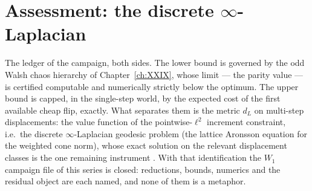 \section{Assessment: the discrete \texorpdfstring{$\infty$}{infinity}-Laplacian}\label{XXXVII:sec:assessment}

The ledger of the campaign, both sides. The lower bound is governed by the odd Walsh
chaos hierarchy of Chapter~\ref{ch:XXIX}, whose limit --- the parity value --- is certified
computable and numerically strictly below the optimum. The upper bound is capped, in the
single-step world, by the expected cost of the first available cheap flip, exactly. What
separates them is the metric $d_L$ on multi-step displacements: the value function of
the pointwise-$\ell^2$ increment constraint, i.e.\ the discrete $\infty$-Laplacian
geodesic problem (the lattice Aronsson equation for the weighted cone norm), whose exact
solution on the relevant displacement classes is the one remaining instrument
\cite{Villani}. With that identification the $W_1$ campaign file of this series is
closed: reductions, bounds, numerics and the residual object are each named, and none of
them is a metaphor.

